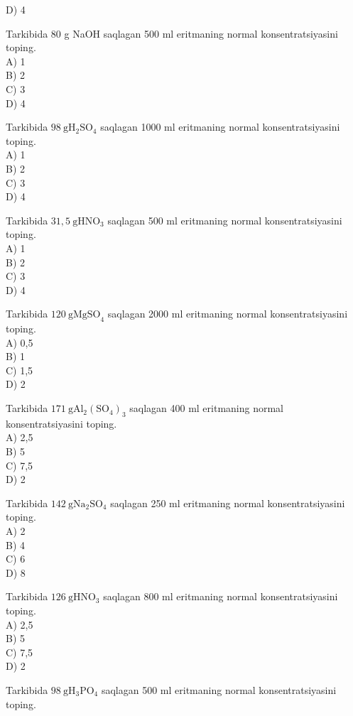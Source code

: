 D) 4
  \item Tarkibida 80 g NaOH saqlagan 500 ml eritmaning normal konsentratsiyasini toping.\\
A) 1\\
B) 2\\
C) 3\\
D) 4
  \item Tarkibida $98 \mathrm{~g} \mathrm{H}_{2} \mathrm{SO}_{4}$ saqlagan 1000 ml eritmaning normal konsentratsiyasini toping.\\
A) 1\\
B) 2\\
C) 3\\
D) 4
  \item Tarkibida $31,5 \mathrm{~g} \mathrm{HNO}_{3}$ saqlagan 500 ml eritmaning normal konsentratsiyasini toping.\\
A) 1\\
B) 2\\
C) 3\\
D) 4
  \item Tarkibida $120 \mathrm{~g} \mathrm{MgSO}_{4}$ saqlagan 2000 ml eritmaning normal konsentratsiyasini toping.\\
A) 0,5\\
B) 1\\
C) 1,5\\
D) 2
  \item Tarkibida $171 \mathrm{~g} \mathrm{Al}_{2}\left(\mathrm{SO}_{4}\right)_{3}$ saqlagan 400 ml eritmaning normal konsentratsiyasini toping.\\
A) 2,5\\
B) 5\\
C) 7,5\\
D) 2
  \item Tarkibida $142 \mathrm{~g} \mathrm{Na}_{2} \mathrm{SO}_{4}$ saqlagan 250 ml eritmaning normal konsentratsiyasini toping.\\
A) 2\\
B) 4\\
C) 6\\
D) 8
  \item Tarkibida $126 \mathrm{~g} \mathrm{HNO}_{3}$ saqlagan 800 ml eritmaning normal konsentratsiyasini toping.\\
A) 2,5\\
B) 5\\
C) 7,5\\
D) 2
  \item Tarkibida $98 \mathrm{~g} \mathrm{H}_{3} \mathrm{PO}_{4}$ saqlagan 500 ml eritmaning normal konsentratsiyasini toping.\\
